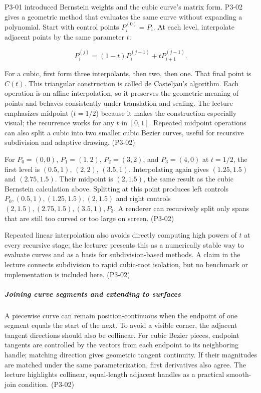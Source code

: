 P3-01 introduced Bernstein weights and the cubic curve's matrix form. P3-02 gives a geometric method that evaluates the same curve without expanding a polynomial. Start with control points \(P_i^{(0)}=P_i\). At each level, interpolate adjacent points by the same parameter \(t\):

\[
P_i^{(j)}=(1-t)P_i^{(j-1)}+tP_{i+1}^{(j-1)}.
\]

For a cubic, first form three interpolants, then two, then one. That final point is \(C(t)\). This triangular construction is called de Casteljau's algorithm. Each operation is an affine interpolation, so it preserves the geometric meaning of points and behaves consistently under translation and scaling. The lecture emphasizes midpoint (\(t=1/2\)) because it makes the construction especially visual; the recurrence works for any \(t\) in \([0,1]\). Repeated midpoint operations can also split a cubic into two smaller cubic Bezier curves, useful for recursive subdivision and adaptive drawing. (P3-02)

For \(P_0=(0,0)\), \(P_1=(1,2)\), \(P_2=(3,2)\), and \(P_3=(4,0)\) at \(t=1/2\), the first level is \((0.5,1)\), \((2,2)\), \((3.5,1)\). Interpolating again gives \((1.25,1.5)\) and \((2.75,1.5)\). Their midpoint is \((2,1.5)\), the same result as the cubic Bernstein calculation above. Splitting at this point produces left controls \(P_0,(0.5,1),(1.25,1.5),(2,1.5)\) and right controls \((2,1.5),(2.75,1.5),(3.5,1),P_3\). A renderer can recursively split only spans that are still too curved or too large on screen. (P3-02)

Repeated linear interpolation also avoids directly computing high powers of \(t\) at every recursive stage; the lecturer presents this as a numerically stable way to evaluate curves and as a basis for subdivision-based methods. A claim in the lecture connects subdivision to rapid cubic-root isolation, but no benchmark or implementation is included here. (P3-02)

\subparagraph{Joining curve segments and extending to surfaces}\label{joining-curve-segments-and-extending-to-surfaces}

A piecewise curve can remain position-continuous when the endpoint of one segment equals the start of the next. To avoid a visible corner, the adjacent tangent directions should also be collinear. For cubic Bezier pieces, endpoint tangents are controlled by the vectors from each endpoint to its neighboring handle; matching direction gives geometric tangent continuity. If their magnitudes are matched under the same parameterization, first derivatives also agree. The lecture highlights collinear, equal-length adjacent handles as a practical smooth-join condition. (P3-02)

